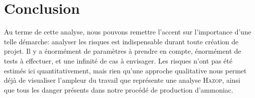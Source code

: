 \documentclass{article}
\begin{document}
\newpage
\section{Conclusion}
Au terme de cette analyse, nous pouvons remettre l'accent sur l'importance d'une telle démarche: analyser les risques est indispensable durant toute création de projet. Il y a énormément de paramètres à prendre en compte, énormément de tests à effectuer, et une infinité de cas à envisager. Les risques n'ont pas été estimés ici quantitativement, mais rien qu'une approche qualitative nous permet déjà de visualiser l'ampleur du travail que représente une analyse \textsc{Hazop}, ainsi que tous les danger présents dans notre procédé de production d'ammoniac.

\nocite{*}
\end{document}
